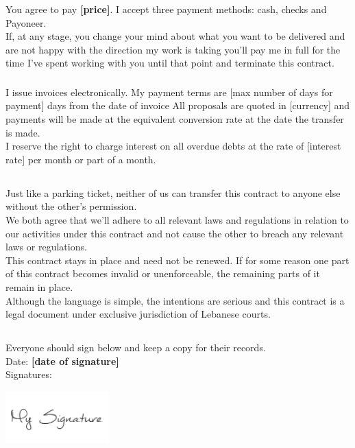 \documentclass[10px,a4paper]{article}
\newcommand{\workPrice}{[price]}
\newcommand{\maxNumberOfDaysForPayment}{[max number of days for payment]}
\newcommand{\currency}{[currency]}
\newcommand{\interestRate}{[interest rate]}
\newcommand{\dateOfSignature}{[date of signature]}
\begin{document}
You agree to pay \textbf{\workPrice{}}.
I accept three payment methods: cash, checks and Payoneer.\\

If, at any stage, you change your mind about what you want to be delivered and are not happy
with the direction my work is taking you'll pay me in full for the time I've spent working
with you until that point and terminate this contract.

\subsubsection*{}

I issue invoices electronically. My payment terms are \maxNumberOfDaysForPayment{} days from the date of invoice
All proposals are quoted in \currency{} and payments will be made at the equivalent conversion
rate at the date the transfer is made.\\

I reserve the right to charge interest on all overdue debts at the rate of \interestRate{} per month or part of a month.

\subsection*{}

Just like a parking ticket, neither of us can transfer this contract to anyone else without the other's permission.\\

We both agree that we'll adhere to all relevant laws and regulations in relation to our activities under
this contract and not cause the other to breach any relevant laws or regulations.\\

This contract stays in place and need not be renewed. If for some reason one part of this contract
becomes invalid or unenforceable, the remaining parts of it remain in place.\\

Although the language is simple, the intentions are serious and this contract is a legal document
under exclusive jurisdiction of Lebanese courts.

\clearpage
\subsection*{}

Everyone should sign below and keep a copy for their records.\\

Date: \textbf{\dateOfSignature{}}\\

Signatures:

\includegraphics[width=4.0cm]{signature.png}
\end{document}
